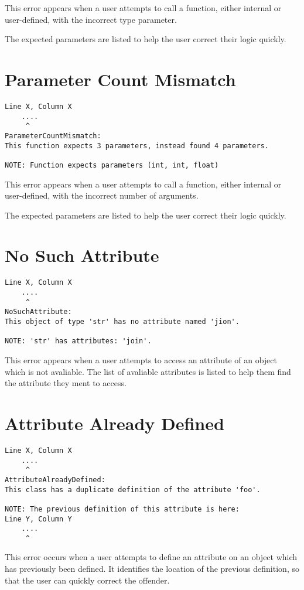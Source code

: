 This error appears when a user attempts to call a function, either internal or user-defined,
with the incorrect type parameter.

The expected parameters are listed to help the user correct their logic quickly.

\section{Parameter Count Mismatch}
\begin{lstlisting}[breaklines]
Line X, Column X
    ....
     ^
ParameterCountMismatch:
This function expects 3 parameters, instead found 4 parameters.

NOTE: Function expects parameters (int, int, float)
\end{lstlisting}

This error appears when a user attempts to call a function, either internal or user-defined,
with the incorrect number of arguments.

The expected parameters are listed to help the user correct their logic quickly.

\section{No Such Attribute}
\begin{lstlisting}[breaklines]
Line X, Column X
    ....
     ^
NoSuchAttribute:
This object of type 'str' has no attribute named 'jion'.

NOTE: 'str' has attributes: 'join'.
\end{lstlisting}

This error appears when a user attempts to access an attribute of an object
which is not avaliable. The list of avaliable attributes is listed to help them
find the attribute they ment to access.

\section{Attribute Already Defined}
\begin{lstlisting}[breaklines]
Line X, Column X
    ....
     ^
AttributeAlreadyDefined:
This class has a duplicate definition of the attribute 'foo'.

NOTE: The previous definition of this attribute is here:
Line Y, Column Y
    ....
     ^
\end{lstlisting}

This error occurs when a user attempts to define an attribute on an object which
has previously been defined. It identifies the location of the previous
definition, so that the user can quickly correct the offender.


